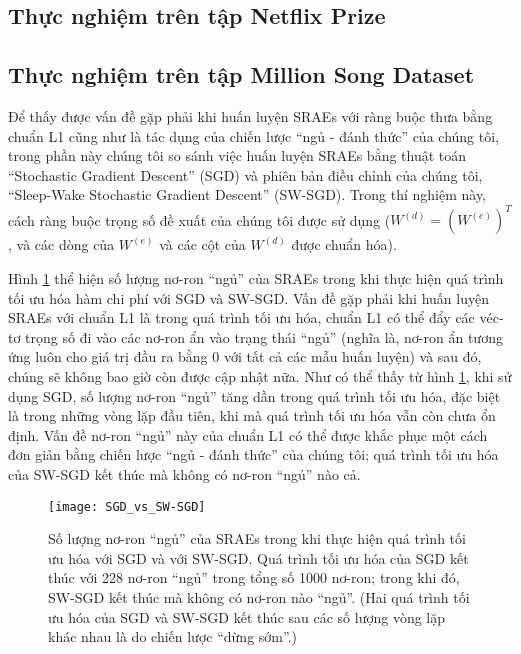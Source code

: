 \subsection{Thực nghiệm trên tập Netflix Prize}
\subsection{Thực nghiệm trên tập Million Song Dataset}

Để thấy được vấn đề gặp phải khi huấn luyện SRAEs với ràng buộc thưa bằng chuẩn L1 cũng như là tác dụng của chiến lược ``ngủ - đánh thức'' của chúng tôi, trong phần này chúng tôi so sánh việc huấn luyện SRAEs bằng thuật toán ``Stochastic Gradient Descent'' (SGD) và phiên bản điều chỉnh của chúng tôi, ``Sleep-Wake Stochastic Gradient Descent'' (SW-SGD). Trong thí nghiệm này, cách ràng buộc trọng số đề xuất của chúng tôi được sử dụng ($W^{(d)} = (W^{(e)})^T$, và các dòng của $W^{(e)}$ và các cột của $W^{(d)}$ được chuẩn hóa).

Hình \ref{fig_SGDvsSWSGD} thể hiện số lượng nơ-ron ``ngủ'' của SRAEs trong khi thực hiện quá trình tối ưu hóa hàm chi phí với SGD và SW-SGD. Vấn đề gặp phải khi huấn luyện SRAEs với chuẩn L1 là trong quá trình tối ưu hóa, chuẩn L1 có thể đẩy các véc-tơ trọng số đi vào các nơ-ron ẩn vào trạng thái ``ngủ'' (nghĩa là, nơ-ron ẩn tương ứng luôn cho giá trị đầu ra bằng 0 với tất cả các mẫu huấn luyện) và sau đó, chúng sẽ không bao giờ còn được cập nhật nữa. Như có thể thấy từ hình \ref{fig_SGDvsSWSGD}, khi sử dụng SGD, số lượng nơ-ron ``ngủ'' tăng dần trong quá trình tối ưu hóa, đặc biệt là trong những vòng lặp đầu tiên, khi mà quá trình tối ưu hóa vẫn còn chưa ổn định. Vấn đề nơ-ron ``ngủ'' này của chuẩn L1 có thể được khắc phục một cách đơn giản bằng chiến lược ``ngủ - đánh thức'' của chúng tôi; quá trình tối ưu hóa của SW-SGD kết thúc mà không có nơ-ron ``ngủ'' nào cả.
\begin{figure}
	\centering
	\texttt{[image: SGD\_vs\_SW-SGD]}
	\caption[So sánh giữa SGD với SW-SGD]{Số lượng nơ-ron ``ngủ'' của SRAEs trong khi thực hiện quá trình tối ưu hóa với SGD và với SW-SGD. Quá trình tối ưu hóa của SGD kết thúc với 228 nơ-ron ``ngủ'' trong tổng số 1000 nơ-ron; trong khi đó, SW-SGD kết thúc mà không có nơ-ron nào ``ngủ''. (Hai quá trình tối ưu hóa của SGD và SW-SGD kết thúc sau các số lượng vòng lặp khác nhau là do chiến lược ``dừng sớm''.)}
	\label{fig_SGDvsSWSGD}
\end{figure}

